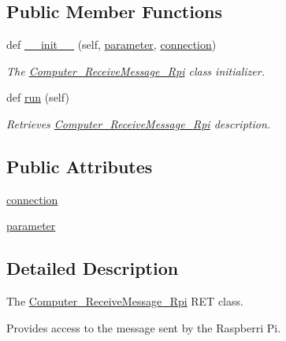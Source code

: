 \subsection*{Public Member Functions}
\begin{DoxyCompactItemize}
\item 
def \hyperlink{classRET__socket_1_1Computer__ReceiveMessage__Rpi_a1370d57533cdac08e579f9012c0bcd7d}{\+\_\+\+\_\+init\+\_\+\+\_\+} (self, \hyperlink{classRET__socket_1_1Computer__ReceiveMessage__Rpi_a0d71b5c1dcca8d3fee88d6a11d3e2071}{parameter}, \hyperlink{classRET__socket_1_1Computer__ReceiveMessage__Rpi_a10275a078bd1abcbebc206cc5d19e18b}{connection})
\begin{DoxyCompactList}\small\item\em The \hyperlink{classRET__socket_1_1Computer__ReceiveMessage__Rpi}{Computer\+\_\+\+Receive\+Message\+\_\+\+Rpi} class initializer. \end{DoxyCompactList}\item 
def \hyperlink{classRET__socket_1_1Computer__ReceiveMessage__Rpi_ad22709b2e67308af35f55680d5a026e0}{run} (self)
\begin{DoxyCompactList}\small\item\em Retrieves \hyperlink{classRET__socket_1_1Computer__ReceiveMessage__Rpi}{Computer\+\_\+\+Receive\+Message\+\_\+\+Rpi} description. \end{DoxyCompactList}\end{DoxyCompactItemize}
\subsection*{Public Attributes}
\begin{DoxyCompactItemize}
\item 
\hyperlink{classRET__socket_1_1Computer__ReceiveMessage__Rpi_a10275a078bd1abcbebc206cc5d19e18b}{connection}
\item 
\hyperlink{classRET__socket_1_1Computer__ReceiveMessage__Rpi_a0d71b5c1dcca8d3fee88d6a11d3e2071}{parameter}
\end{DoxyCompactItemize}


\subsection{Detailed Description}
The \hyperlink{classRET__socket_1_1Computer__ReceiveMessage__Rpi}{Computer\+\_\+\+Receive\+Message\+\_\+\+Rpi} R\+ET class. 

Provides access to the message sent by the Raspberri Pi. 

